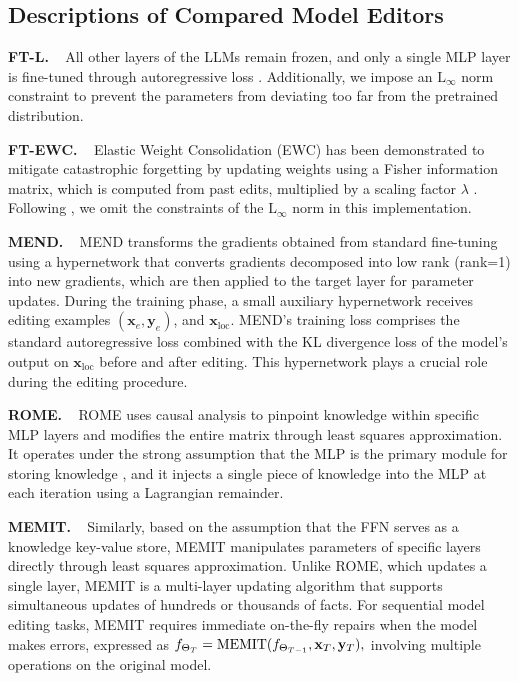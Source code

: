 \subsection{Descriptions of Compared Model Editors}\label{baselines}
\textbf{FT-L.} ~
All other layers of the LLMs remain frozen, and only a single MLP layer is fine-tuned through autoregressive loss \cite{rome}. 
Additionally, we impose an $\text{L}_{\infty}$ norm constraint to prevent the parameters from deviating too far from the pretrained distribution.

\textbf{FT-EWC.} ~
Elastic Weight Consolidation (EWC) has been demonstrated to mitigate catastrophic forgetting by updating weights using a Fisher information matrix, which is computed from past edits, multiplied by a scaling factor $\lambda$ \cite{ewc}.
Following \cite{grace}, we omit the constraints of the $\text{L}_{\infty}$ norm in this implementation.

\textbf{MEND.} ~
MEND \cite{mend} transforms the gradients obtained from standard fine-tuning using a hypernetwork that converts gradients decomposed into low rank (rank=1) into new gradients, which are then applied to the target layer for parameter updates.
During the training phase, a small auxiliary hypernetwork receives editing examples $(\mathbf{x}_e, \mathbf{y}_e)$, and $\mathbf{x}_{\text{loc}}$.
MEND's training loss comprises the standard autoregressive loss combined with the KL divergence loss of the model's output on $\mathbf{x}_{\text{loc}}$ before and after editing.
This hypernetwork plays a crucial role during the editing procedure.

\textbf{ROME.} ~
ROME \cite{rome} uses causal analysis to pinpoint knowledge within specific MLP layers and modifies the entire matrix through least squares approximation.
It operates under the strong assumption that the MLP is the primary module for storing knowledge \cite{geva-etal-2021-transformer}, and it injects a single piece of knowledge into the MLP at each iteration using a Lagrangian remainder.

\textbf{MEMIT.} ~
Similarly, based on the assumption that the FFN serves as a knowledge key-value store, MEMIT \cite{memit} manipulates parameters of specific layers directly through least squares approximation.
Unlike ROME, which updates a single layer, MEMIT is a multi-layer updating algorithm that supports simultaneous updates of hundreds or thousands of facts.
For sequential model editing tasks, MEMIT requires immediate on-the-fly repairs when the model makes errors, expressed as $f_{\Theta_{T}} = {\rm MEMIT}(f_{\Theta_{T-1}}, \mathbf{x}_T, \mathbf{y}_T),$ involving multiple operations on the original model.

